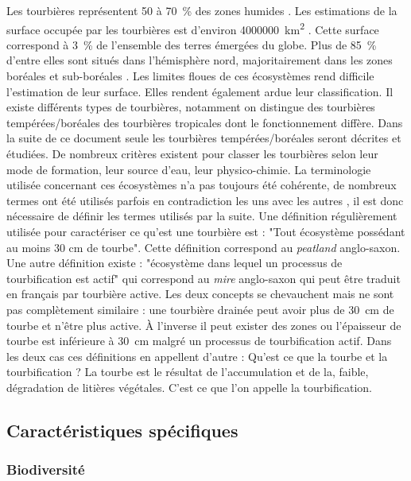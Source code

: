 Les tourbières représentent 50 à \SI{70}{\percent} des zones humides \cite{francez2000,joosten2002}.
Les estimations de la surface occupée par les tourbières est d'environ \SI{4000000}{\square\kilo\meter} \cite{lappalainen1996}.
Cette surface correspond à \SI{3}{\percent} de l'ensemble des terres émergées du globe.
Plus de \SI{85}{\percent} d'entre elles sont situés dans l'hémisphère nord, majoritairement dans les zones boréales et sub-boréales \cite{society2008}.
Les limites floues de ces écosystèmes rend difficile l'estimation de leur surface.
Elles rendent également ardue leur classification.
Il existe différents types de tourbières, notamment on distingue des tourbières tempérées/boréales des tourbières tropicales dont le fonctionnement diffère.
Dans la suite de ce document seule les tourbières tempérées/boréales seront décrites et étudiées.
De nombreux critères existent pour classer les tourbières selon leur mode de formation, leur source d'eau, leur physico-chimie.
La terminologie utilisée concernant ces écosystèmes n'a pas toujours été cohérente, de nombreux termes ont été utilisés parfois en contradiction les uns avec les autres \cite{joosten2002}, il est donc nécessaire de définir les termes utilisés par la suite. 
Une définition régulièrement utilisée pour caractériser ce qu'est une tourbière est : "Tout écosystème possédant au moins 30 cm de tourbe".
Cette définition correspond au \textit{peatland} anglo-saxon.
Une autre définition existe  : "écosystème dans lequel un processus de tourbification est actif" qui correspond au \textit{mire} anglo-saxon qui peut être traduit en français par tourbière active.
Les deux concepts se chevauchent mais ne sont pas complètement similaire : une tourbière drainée peut avoir plus de \SI{30}{cm} de tourbe et n'être plus active.
À l'inverse il peut exister des zones ou l'épaisseur de tourbe est inférieure à \SI{30}{cm} malgré un processus de tourbification actif.
Dans les deux cas ces définitions en appellent d'autre : Qu'est ce que la tourbe et la tourbification ?
La tourbe est le résultat de l'accumulation et de la, faible, dégradation de litières végétales.
C'est ce que l'on appelle la tourbification.


\subsection{Caractéristiques spécifiques}

\subsubsection{Biodiversité}

